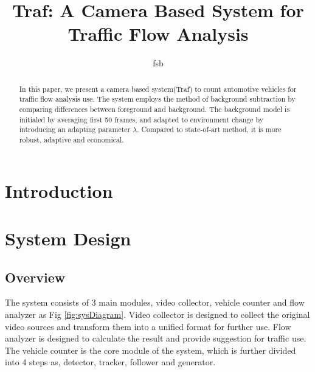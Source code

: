 \documentclass[conference]{IEEEtran}
\begin{document}
\title{Traf: A Camera Based System for Traffic Flow Analysis}
\maketitle
\author{fsb}

\begin{abstract}

In this paper, we present a camera based system(Traf) to count automotive vehicles for traffic flow analysis use. The system employs the method of background subtraction by comparing differences between foreground and background. The background model is initialed by averaging first 50 frames, and adapted to environment change by introducing an adapting parameter $\lambda$. Compared to state-of-art method, it is more robust, adaptive and economical.

\end{abstract}


\section{Introduction}


\section{System Design}
	\subsection{Overview}
	The system consists of 3 main modules, video collector, vehicle counter and flow analyzer as Fig \ref{fig:sysDiagram}. Video collector is designed to collect the original video sources and transform them into a unified format for further use. Flow analyzer is designed to calculate the result and provide suggestion for traffic use. The vehicle counter is the core module of the system, which is further divided into 4 steps as, detector, tracker, follower and generator. 
	
\end{document}
